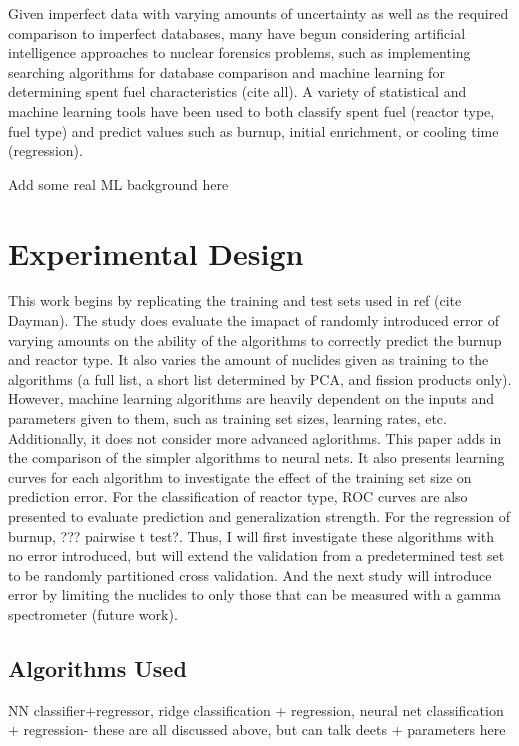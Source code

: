 \documentclass{anstrans}
\begin{document}
Given imperfect data with varying amounts of uncertainty as well as the
required comparison to imperfect databases, many have begun considering
artificial intelligence approaches to nuclear forensics problems, such as
implementing searching algorithms for database comparison and machine learning
for determining spent fuel characteristics (cite all). A variety of statistical
and machine learning tools have been used to both classify spent fuel (reactor
type, fuel type) and predict values such as burnup, initial enrichment, or
cooling time (regression).

Add some real ML background here

\section{Experimental Design}

This work begins by replicating the training and test sets used in ref (cite
Dayman). The study does evaluate the imapact of randomly introduced error of
varying amounts on the ability of the algorithms to correctly predict the
burnup and reactor type. It also varies the amount of nuclides given as
training to the algorithms (a full list, a short list determined by PCA, and
fission products only). However, machine learning algorithms are heavily
dependent on the inputs and parameters given to them, such as training set
sizes, learning rates, etc. Additionally, it does not consider more advanced
aglorithms. This paper adds in the comparison of the simpler algorithms to
neural nets. It also presents learning curves for each algorithm to investigate
the effect of the training set size on prediction error. For the classification
of reactor type, ROC curves are also presented to evaluate prediction and
generalization strength. For the regression of burnup, ??? pairwise t test?.
Thus, I will first investigate these algorithms with no error introduced, but
will extend the validation from a predetermined test set to be randomly
partitioned cross validation.  And the next study will introduce error by
limiting the nuclides to only those that can be measured with a gamma
spectrometer (future work).

\subsection{Algorithms Used}

NN classifier+regressor, ridge classification + regression, neural net
classification + regression- these are all discussed above, but can talk deets
+ parameters here
\end{document}
